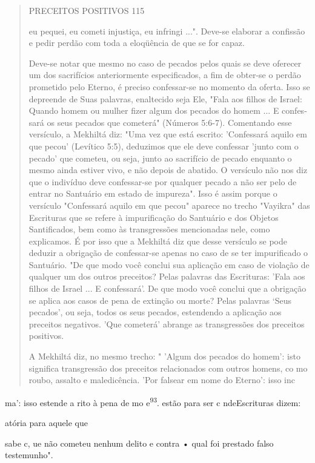 \begin{quote}
PRECEITOS POSITIVOS 115

eu pequei, eu cometi injustiça, eu infringi ...". Deve-se elaborar a
confissão e pedir perdão com toda a eloqüência de que se for capaz.

Deve-se notar que mesmo no caso de pecados pelos quais se deve oferecer
um dos sacrifícios anteriormente especificados, a fim de obter-se o
per­dão prometido pelo Eterno, é preciso confessar-se no momento da
oferta. Isso se depreende de Suas palavras, enaltecido seja Ele, "Fala
aos filhos de Israel: Quando homem ou mulher fizer algum dos pecados do
homem ... E confes­sará os seus pecados que cometerá" (Números 5:6-7).
Comentando esse versí­culo, a Mekhiltá diz: "Uma vez que está escrito:
'Confessará aquilo em que pe­cou' (Levítico 5:5), deduzimos que ele deve
confessar 'junto com o pecado' que cometeu, ou seja, junto ao sacrifício
de pecado enquanto o mesmo ainda estiver vivo, e não depois de abatido.
O versículo não nos diz que o indivíduo deve confessar-se por qualquer
pecado a não ser pelo de entrar no Santuário em estado de impureza".
Isso é assim porque o versículo "Confessará aquilo em que pecou" aparece
no trecho "Vayikra" das Escrituras que se refere à im­purificação do
Santuário e dos Objetos Santificados, bem como às transgres­sões
mencionadas nele, como explicamos. É por isso que a Mekhiltá diz que
desse versículo se pode deduzir a obrigação de confessar-se apenas no
caso de se ter impurificado o Santuário. "De que modo você conclui sua
aplicação em caso de violação de qualquer um dos outros preceitos? Pelas
palavras das Escri­turas: 'Fala aos filhos de Israel ... E confessará'.
De que modo você conclui que a obrigação se aplica aos casos de pena de
extinção ou morte? Pelas palavras `Seus pecados', ou seja, todos os seus
pecados, estendendo a aplicação aos preceitos negativos. 'Que cometerá'
abrange as transgressões dos preceitos positivos.

A Mekhiltá diz, no mesmo trecho: " 'Algum dos pecados do homem': isto
significa transgressão dos preceitos relacionados com outros homens, co
mo roubo, assalto e maledicência. 'Por falsear em nome do Eterno': isso
inc
\end{quote}

ma': isso estende a ri­to à pena de mo e\textsuperscript{93}. estão para
ser c nde­Escrituras dizem:

atória para aquele que

sabe c, ue não cometeu nenhum delito e contra • qual foi prestado falso
testemunho".

